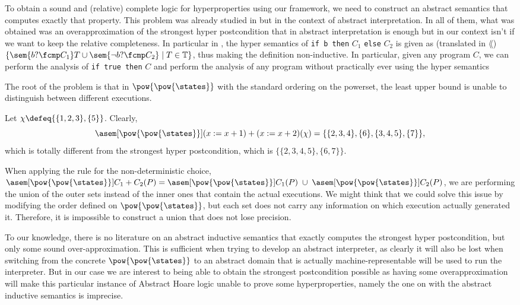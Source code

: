 To obtain a sound and (relative) complete logic for hyperproperties using
our framework, we need to construct an abstract semantics that computes
exactly that property. This problem was already studied in \cite{Mounir17,
Mastroeni18} but in the context of abstract interpretation. In all of them,
what was obtained was an overapproximation of the strongest hyper postcondition
that in abstract interpretation is enough but in our context isn't if we want
to keep the relative completeness. In particular in \cite{Mounir17},
the hyper semantics of \texttt{if b then} $C_1$ \texttt{else} $C_2$ is given
as (translated in $\lang$) $\{ \sem{b ? \fcmp C_1} T \cup 
\sem{\neg b ? \fcmp C_2} \mid T \in \mathbb{T}\}$, thus making the definition
non-inductive. In particular, given any program $C$, we can perform the analysis
of \texttt{if true then} $C$ and perform the analysis of any program without 
practically ever using the hyper semantics

The root of the problem is that in $\pow{\pow{\states}}$ with the standard 
ordering on the powerset, the least upper bound is unable to distinguish between
different executions.

\begin{example}
  \label{exmp:determinism}
  Let $\chi \defeq \{\{1, 2, 3\}, \{5\}\}$. Clearly,
  $$\asem[\pow{\pow{\states}}]{(x := x + 1) + (x := x + 2)}(\chi) = 
  \{\{2, 3, 4\}, \{6\}, \{3, 4, 5\}, \{7\}\},$$
  which is totally different from the strongest hyper postcondition, 
  which is $\{\{2, 3, 4, 5\}, \{6, 7\}\}$.
\end{example}


When applying the rule for the non-deterministic choice, 
$\asem[\pow{\pow{\states}}]{C_1 + C_2}(P) = \asem[\pow{\pow{\states}}]{C_1}(P) 
\;\cup\; \asem[\pow{\pow{\states}}]{C_2}(P)$, we are performing the union of the 
outer sets instead of the inner ones that contain the actual executions. We 
might think that we could solve this issue by modifying the order defined on 
$\pow{\pow{\states}}$, but each set does not carry any information on which 
execution actually generated it. Therefore, it is impossible to construct a 
union that does not lose precision.

To our knowledge, there is no literature on an abstract inductive semantics
that exactly computes the strongest hyper postcondition, but only some sound
over-approximation. This is sufficient when trying to develop an abstract
interpreter, as clearly it will also be lost when switching from the concrete
$\pow{\pow{\states}}$ to an abstract domain that is actually
machine-representable will be used to run the interpreter. But in our case we
are interest to being able to obtain the strongest postcondition possible as
having some overapproximation will make this particular instance of Abstract
Hoare logic unable to prove some hyperproperties, namely the one on with the
abstract inductive semantics is imprecise.

